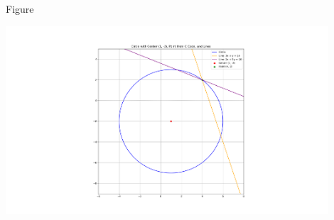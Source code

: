 \documentclass{beamer}
\begin{document}
\begin{frame}{Figure}
    \begin{center}
\includegraphics[width=0.9\textwidth]{figs/Figure_1.png}
\end{center}
\end{frame}
\end{document}
